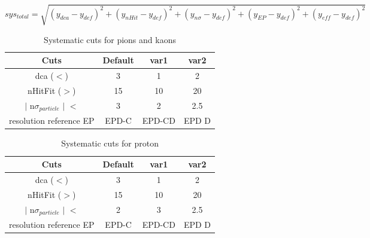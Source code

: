 \begin{equation}
	sys_{total}=\sqrt{(y_{dca}-y_{def})^{2} + (y_{nHit}-y_{def})^{2} + (y_{n\sigma}-y_{def})^{2} + (y_{EP}-y_{def})^{2} + (y_{eff}-y_{def})^{2}}
\label{sys_equation}
\end{equation}

\begin{table}[ht]
\caption{Systematic cuts for pions and kaons}
\label{sys_cut_pionkaon}
\begin{tabular}{cccc}
\hline
Cuts & Default & var1 & var2\\ 
\hline
dca ($<$) & 3 & 1 & 2\\ 
nHitFit ($>$) & 15 & 10 & 20\\ 
$|$ n$\sigma_{particle}$ $|$ $<$ & 3 & 2 & 2.5 \\ 
resolution reference EP & EPD-C & EPD-CD & EPD D\\ 
\hline
\end{tabular} 
\end{table}


\begin{table}[ht]
\caption{Systematic cuts for proton}
\label{sys_cut_proton}
\begin{tabular}{cccc}
\hline
Cuts & Default & var1 & var2\\ 
\hline
dca ($<$) & 3 & 1 & 2\\ 
nHitFit ($>$) & 15 & 10 & 20\\ 
$|$ n$\sigma_{particle}$ $|$ $<$ & 2 & 3 & 2.5 \\ 
resolution reference EP & EPD-C & EPD-CD & EPD D\\ 
\hline
\end{tabular} 
\end{table}

